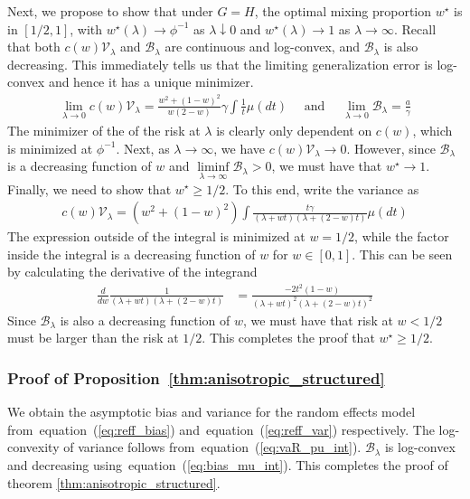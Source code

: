 \documentclass[10pt]{article}
\def\eqref#1{equation~(\ref{#1})}
\newcommand{\mv}{\mathcal{V}}
\numberwithin{thm}{section}
\numberwithin{remark}{section}
\numberwithin{ex}{section}
\numberwithin{ass}{section}
\numberwithin{defn}{section}
\numberwithin{lemma}{section}
\numberwithin{corollary}{section}
\numberwithin{prop}{section}
\newcommand{\mb}{\mathcal{B}}
\numberwithin{equation}{section}
\begin{document}
Next, we propose to show that under $G=H$, the optimal mixing proportion $w^{\star}$ is in $[1/2, 1]$, with $w^{\star}(\lambda) \to \phi^{-1}$ as $\lambda \downarrow 0$ and $w^{\star}(\lambda) \to 1$ as $\lambda \rightarrow \infty$. Recall that both $c(w) \mv_\lambda$ and $\mb_\lambda$ are continuous and log-convex, and $\mb_\lambda$ is also decreasing.
This immediately tells us that the limiting generalization error is log-convex and hence it has a unique minimizer.
\begin{align}\label{eq:mu_v}
\lim_{\lambda \to 0} c(w) \mv_\lambda = \frac{w^2 + (1-w)^2}{w(2-w)} \gamma \int \frac{1}{t}\mu(dt) \quad \text{ and } \quad \lim_{\lambda \to 0} \mb_\lambda = \frac{a}{\gamma}
\end{align}
The minimizer of the of the risk at $\lambda$ is clearly only dependent on $c(w)$, which is minimized at $\phi^{-1}$. Next, as $\lambda \to \infty$, we have $c(w)\mv_\lambda \to 0$. However, since $\mb_\lambda$ is a decreasing function of $w$ and $
\liminf\limits_{\lambda \rightarrow \infty} \mb_\lambda>0$, we must have that $w^{\star} \to 1$. Finally, we need to show that $w^{\star} \ge 1/2$. To this end, write the variance as
\begin{align*}
c(w) \mv_\lambda = (w^2+(1-w)^2) \int \frac{t\gamma}{(\lambda + w t)(\lambda +(2-w)t)} \mu(dt)
\end{align*}
The expression outside of the integral is minimized at $w=1/2$, while the factor inside the integral is a decreasing function of $w$ for $w \in [0,1]$.
This can be seen by calculating the derivative of the integrand
\begin{align}\label{eq:v_half}
\frac{d}{dw} \frac{1}{(\lambda + w t)(\lambda +(2-w)t)} &= \frac{-2t^2(1-w)}{(\lambda + w t)^2(\lambda +(2-w)t)^2}
\end{align}
Since $\mb_\lambda$ is also a decreasing function of $w$, we must have that risk at $w < 1/2$ must be larger than the risk at $1/2$.
This completes the proof that $w^{\star} \ge 1/2$.

\subsubsection*{Proof of Proposition~\ref{thm:anisotropic_structured}}
We obtain the asymptotic bias and variance for the random effects model from~\eqref{eq:reff_bias} and~\eqref{eq:reff_var} respectively. The log-convexity of variance follows from~\eqref{eq:vaR_pu_int}. $\mathcal{B}_{\lambda}$ is log-convex and decreasing using~\eqref{eq:bias_mu_int}. This completes the proof of theorem \ref{thm:anisotropic_structured}.
\end{document}
